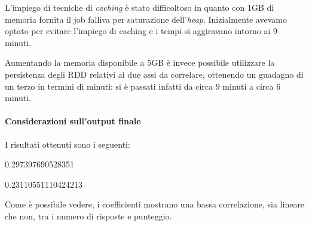   L'impiego di tecniche di \textit{caching} è stato difficoltoso in quanto con 1GB di memoria fornita il job falliva per saturazione dell'\textit{heap}.
  Inizialmente avevamo optato per evitare l'impiego di caching e i tempi si aggiravano intorno ai 9 minuti.

  Aumentando la memoria disponibile a 5GB è invece possibile utilizzare la persistenza degli RDD relativi ai due assi da correlare, ottenendo un guadagno di un terzo in termini di minuti:
  si è passati infatti da circa 9 minuti a circa 6 minuti.

  \paragraph{Considerazioni sull'output finale}

  I risultati ottenuti sono i seguenti:

  \begin{description}[itemsep=1pt]
    \item[\textit{Coefficiente di \textbf{Pearson}}] 0.297397690528351
    \item[\textit{Coefficiente di \textbf{Spearman}}] 0.23110551110424213
  \end{description}

  Come è possibile vedere, i coefficienti mostrano una bassa correlazione, sia lineare che non, tra i numero di risposte e punteggio.
